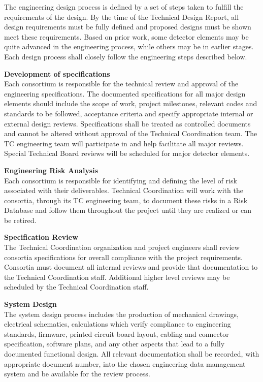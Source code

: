 The engineering design process is defined by a set of steps taken to
fulfill the requirements of the design.  By the time of the Technical
Design Report, all design requirements must be fully defined and
proposed designs must be shown meet these requirements.  Based on
prior work, some detector elements may be quite advanced in the
engineering process, while others may be in earlier stages.  Each
design process shall closely follow the engineering steps described
below.


{\bf Development of specifications}\\
Each consortium is responsible for the technical review and approval
of the engineering specifications.  The documented specifications for
all major design elements should include the scope of work, project
milestones, relevant codes and standards to be followed, acceptance
criteria and specify appropriate internal or external design reviews.
Specifications shall be treated as controlled documents and cannot be
altered without approval of the  Technical Coordination team.  The
TC engineering team will participate in and help facilitate all
major reviews.  Special Technical Board reviews will be scheduled for
major detector elements.

{\bf Engineering Risk Analysis}\\
Each consortium is responsible for identifying and defining the level
of risk associated with their deliverables.   Technical
Coordination will work with the consortia, through its
TC engineering team, to document these risks in a Risk Database
and follow them throughout the project until they are realized or can
be retired.

{\bf Specification Review}\\
The  Technical Coordination organization and project engineers
shall review consortia specifications for overall compliance with the
project requirements.  Consortia must document all internal reviews
and provide that documentation to the Technical Coordination staff.
Additional higher level reviews may be scheduled by the Technical
Coordination staff.

{\bf System Design}\\
The system design process includes the production of mechanical
drawings, electrical schematics, calculations which verify compliance
to engineering standards, firmware, printed circuit board layout,
cabling and connector specification, software plans, and any other
aspects that lead to a fully documented functional design.  All
relevant documentation shall be recorded, with appropriate document
number, into the chosen engineering data management system and be
available for the review process.

